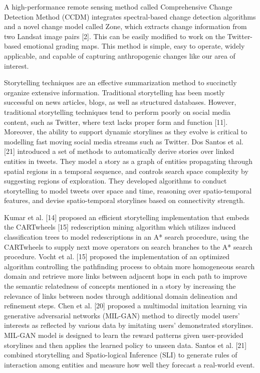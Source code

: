 \documentclass[conference]{IEEEtran}
\begin{document}
A high-performance remote sensing method called Comprehensive Change Detection Method (CCDM) integrates spectral-based change detection algorithms and a novel change model called Zone, which extracts change information from two Landsat image pairs [2]. This can be easily modified to work on the Twitter-based emotional grading maps. This method is simple, easy to operate, widely applicable, and capable of capturing anthropogenic changes like our area of interest.

Storytelling techniques are an effective summarization method to succinctly organize extensive information. Traditional storytelling has been mostly successful on news articles, blogs, as well as structured databases. However, traditional storytelling techniques tend to perform poorly on social media content, such as Twitter, where text lacks proper form and function [11]. Moreover, the ability to support dynamic storylines as they evolve is critical to modelling fast moving social media streams such as Twitter. Dos Santos et al. [21] introduced a set of methods to automatically derive stories over linked entities in tweets. They model a story as a graph of entities propagating through spatial regions in a temporal sequence, and controls search space complexity by suggesting regions of exploration. They developed algorithms to conduct storytelling to model tweets over space and time, reasoning over spatio-temporal features, and devise spatio-temporal storylines based on connectivity strength.

Kumar et al. [14] proposed an efficient storytelling implementation that embeds the CARTwheels [15] redescription mining algorithm which utilizes induced classification trees to model redescriptions in an A* search procedure, using the CARTwheels to supply next move operators on search branches to the A* search procedure. Vocht et al. [15] proposed the implementation of an optimized algorithm controlling the pathfinding process to obtain more homogeneous search domain and retrieve more links between adjacent hops in each path to improve the semantic relatedness of concepts mentioned in a story by increasing the relevance of links between nodes through additional domain delineation and refinement steps. Chen et al. [20] proposed a multimodal imitation learning via generative adversarial networks (MIL-GAN) method to directly model users' interests as reflected by various data by imitating users' demonstrated storylines. MIL-GAN model is designed to learn the reward patterns given user-provided storylines and then applies the learned policy to unseen data. Santos et al. [21] combined storytelling and Spatio-logical Inference (SLI) to generate rules of interaction among entities and measure how well they forecast a real-world event. 
\end{document}
